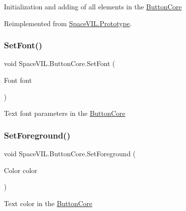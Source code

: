 Initialization and adding of all elements in the \mbox{\hyperlink{class_space_v_i_l_1_1_button_core}{Button\+Core}} 



Reimplemented from \mbox{\hyperlink{class_space_v_i_l_1_1_prototype_ac3379fe02923ee155b5b0084abf27420}{Space\+V\+I\+L.\+Prototype}}.

\mbox{\label{class_space_v_i_l_1_1_button_core_a7689c84be1b1b152a07186a32a08f273}} 
\subsubsection{\texorpdfstring{Set\+Font()}{SetFont()}}
{\footnotesize\ttfamily void Space\+V\+I\+L.\+Button\+Core.\+Set\+Font (\begin{DoxyParamCaption}\item[{Font}]{font }\end{DoxyParamCaption})}



Text font parameters in the \mbox{\hyperlink{class_space_v_i_l_1_1_button_core}{Button\+Core}} 

\mbox{\label{class_space_v_i_l_1_1_button_core_aa9d1ad0d72fc521d412209dd15b5ed54}} 
\subsubsection{\texorpdfstring{Set\+Foreground()}{SetForeground()}}
{\footnotesize\ttfamily void Space\+V\+I\+L.\+Button\+Core.\+Set\+Foreground (\begin{DoxyParamCaption}\item[{Color}]{color }\end{DoxyParamCaption})}



Text color in the \mbox{\hyperlink{class_space_v_i_l_1_1_button_core}{Button\+Core}} 

\mbox{\label{class_space_v_i_l_1_1_button_core_adf846a4e98ee6bbf8722232f10622231}} 
